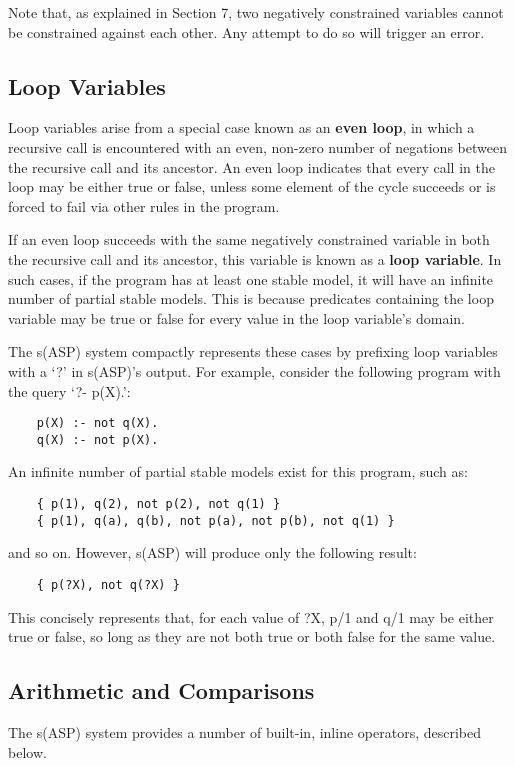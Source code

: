 \documentclass[]{article}
\begin{document}
Note that, as explained in Section 7, two negatively constrained variables 
cannot be constrained against each other. Any attempt to do so will trigger an
error.


\subsection{Loop Variables}

Loop variables arise from a special case known as an \textbf{even loop}, in which a
recursive call is encountered with an even, non-zero number of negations between
the recursive call and its ancestor. An even loop indicates that every call in
the loop may be either true or false, unless some element of the cycle succeeds
or is forced to fail via other rules in the program.

If an even loop succeeds with the same negatively constrained variable in both 
the recursive call and its ancestor, this variable is known as a \textbf{loop variable}. 
In such cases, if the program has at least one stable model, it will have an 
infinite number of partial stable models. This is because predicates containing 
the loop variable may be true or false for every value in the loop variable's 
domain.

The s(ASP) system compactly represents these cases by prefixing loop variables
with a `?' in s(ASP)'s output. For example, consider the following program with
the query `?- p(X).': 
\begin{verbatim}
    p(X) :- not q(X).
    q(X) :- not p(X).
\end{verbatim}
An infinite number of partial stable models exist for this program, such as:
\begin{verbatim}
    { p(1), q(2), not p(2), not q(1) }
    { p(1), q(a), q(b), not p(a), not p(b), not q(1) }
\end{verbatim}
and so on. However, s(ASP) will produce only the following result:
\begin{verbatim}
    { p(?X), not q(?X) }
\end{verbatim}
This concisely represents that, for each value of ?X, p/1 and q/1 may be either
true or false, so long as they are not both true or both false for the same
value.


\subsection{Arithmetic and Comparisons}

The s(ASP) system provides a number of built-in, inline operators, described
below.
\end{document}
